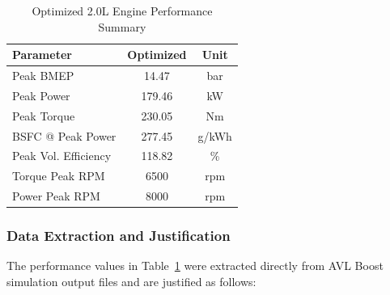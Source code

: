 \begin{table}[H]
    \centering
    \caption{Optimized 2.0L Engine Performance Summary}
    \label{tab:task2_summary}
    \begin{tabular}{lcc}
        \toprule
        Parameter & \textcolor{optimizedcolor}{Optimized} & Unit \\
        \midrule
        Peak BMEP & \textcolor{optimizedcolor}{14.47} & bar \\
        Peak Power & \textcolor{optimizedcolor}{179.46} & kW \\
        Peak Torque & \textcolor{optimizedcolor}{230.05} & Nm \\
        BSFC @ Peak Power & \textcolor{optimizedcolor}{277.45} & g/kWh \\
        Peak Vol. Efficiency & \textcolor{optimizedcolor}{118.82} & \% \\
        Torque Peak RPM & \textcolor{optimizedcolor}{6500} & rpm \\
        Power Peak RPM & \textcolor{optimizedcolor}{8000} & rpm \\
        \bottomrule
    \end{tabular}
\end{table}



\subsubsection{Data Extraction and Justification}

The performance values in Table~\ref{tab:task2_summary} were extracted directly from AVL Boost simulation output files and are justified as follows:

